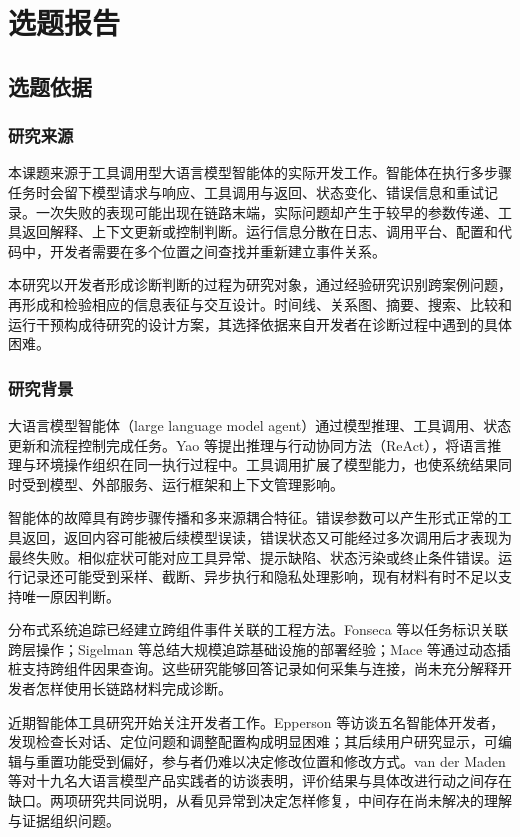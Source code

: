 \chapter{选题报告}\label{chap:selection-report}

\section{选题依据}

\subsection{研究来源}

本课题来源于工具调用型大语言模型智能体的实际开发工作。智能体在执行多步骤任务时会留下模型请求与响应、工具调用与返回、状态变化、错误信息和重试记录。一次失败的表现可能出现在链路末端，实际问题却产生于较早的参数传递、工具返回解释、上下文更新或控制判断。运行信息分散在日志、调用平台、配置和代码中，开发者需要在多个位置之间查找并重新建立事件关系。

本研究以开发者形成诊断判断的过程为研究对象，通过经验研究识别跨案例问题，再形成和检验相应的信息表征与交互设计。时间线、关系图、摘要、搜索、比较和运行干预构成待研究的设计方案，其选择依据来自开发者在诊断过程中遇到的具体困难。

\subsection{研究背景}

大语言模型智能体（large language model agent）通过模型推理、工具调用、状态更新和流程控制完成任务。Yao 等\cite{yao2023react}提出推理与行动协同方法（ReAct），将语言推理与环境操作组织在同一执行过程中。工具调用扩展了模型能力，也使系统结果同时受到模型、外部服务、运行框架和上下文管理影响。

智能体的故障具有跨步骤传播和多来源耦合特征。错误参数可以产生形式正常的工具返回，返回内容可能被后续模型误读，错误状态又可能经过多次调用后才表现为最终失败。相似症状可能对应工具异常、提示缺陷、状态污染或终止条件错误。运行记录还可能受到采样、截断、异步执行和隐私处理影响，现有材料有时不足以支持唯一原因判断。

分布式系统追踪已经建立跨组件事件关联的工程方法。Fonseca 等\cite{ref30}以任务标识关联跨层操作；Sigelman 等\cite{ref32}总结大规模追踪基础设施的部署经验；Mace 等\cite{ref31}通过动态插桩支持跨组件因果查询。这些研究能够回答记录如何采集与连接，尚未充分解释开发者怎样使用长链路材料完成诊断。

近期智能体工具研究开始关注开发者工作。Epperson 等\cite{ref02}访谈五名智能体开发者，发现检查长对话、定位问题和调整配置构成明显困难；其后续用户研究显示，可编辑与重置功能受到偏好，参与者仍难以决定修改位置和修改方式。van der Maden 等\cite{ref01}对十九名大语言模型产品实践者的访谈表明，评价结果与具体改进行动之间存在缺口。两项研究共同说明，从看见异常到决定怎样修复，中间存在尚未解决的理解与证据组织问题。

